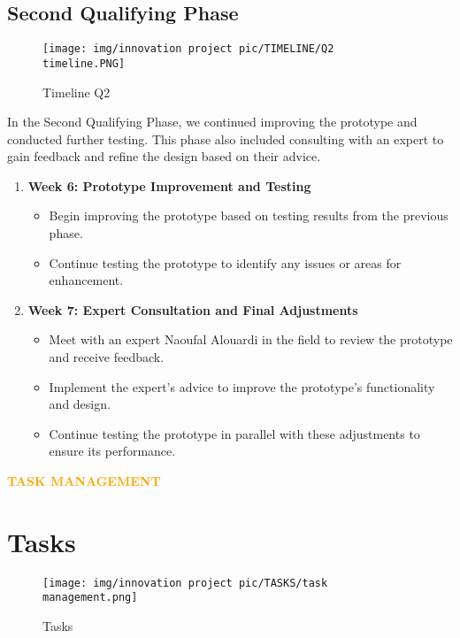 \subsection{Second Qualifying Phase}
\begin{figure}[ht]
    \centering
    \texttt{[image: img/innovation project pic/TIMELINE/Q2 timeline.PNG]}  %
    \caption{Timeline Q2}
    \label{fig:timeline}
\end{figure}

In the Second Qualifying Phase, we continued improving the prototype and conducted further testing. This phase also included consulting with an expert to gain feedback and refine the design based on their advice.

\begin{enumerate}[1.]
    \item \textbf{Week 6: Prototype Improvement and Testing}
    \begin{itemize}
        \item Begin improving the prototype based on testing results from the previous phase.
        \item Continue testing the prototype to identify any issues or areas for enhancement.
    \end{itemize}
    
    \item \textbf{Week 7: Expert Consultation and Final Adjustments}
    \begin{itemize}
        \item Meet with an expert Naoufal Alouardi in the field to review the prototype and receive feedback.
        \item Implement the expert's advice to improve the prototype’s functionality and design.
        \item Continue testing the prototype in parallel with these adjustments to ensure its performance.
    \end{itemize}
\end{enumerate}

\newpage
\begin{center}
    \huge \textbf{\textcolor{orange}{TASK MANAGEMENT }} \\[0.5cm]
 
\end{center}
\section{Tasks}
\begin{figure}[ht]
    \centering
    \texttt{[image: img/innovation project pic/TASKS/task management.png]}  
    \caption{Tasks }
\end{figure}


